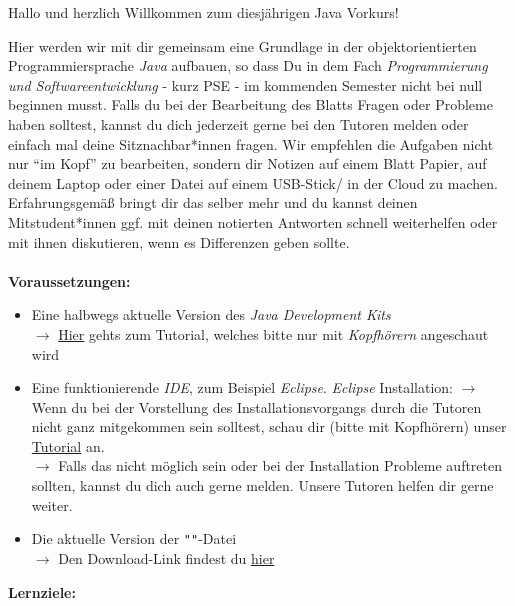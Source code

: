 
\begin{center}
	Hallo und herzlich Willkommen zum diesjährigen Java Vorkurs!\\
\end{center}
Hier werden wir mit dir gemeinsam eine Grundlage in der objektorientierten Programmiersprache \textit{Java} aufbauen, so dass Du in dem Fach \textit{Programmierung und Softwareentwicklung} - kurz PSE - im kommenden Semester nicht bei null beginnen musst.\newline
Falls du bei der Bearbeitung des Blatts Fragen oder Probleme haben solltest, kannst du dich jederzeit gerne bei den Tutoren melden oder einfach mal deine Sitznachbar*innen fragen.\newline
Wir empfehlen die Aufgaben nicht nur \enquote{im Kopf} zu bearbeiten, sondern dir Notizen auf einem Blatt Papier, auf deinem Laptop oder einer Datei auf einem USB-Stick/ in der Cloud zu machen. Erfahrungsgemäß bringt dir das selber mehr und du kannst deinen Mitstudent*innen ggf. mit deinen notierten Antworten schnell weiterhelfen oder mit ihnen diskutieren, wenn es Differenzen geben sollte.\\\\
\textbf{Voraussetzungen:}
\begin{itemize}
	\item Eine halbwegs aktuelle Version des \textit{Java Development Kits}\\
	$\rightarrow$ \href{\jdkTutorial}{Hier} gehts zum Tutorial, welches bitte nur mit \textit{Kopfhörern} angeschaut wird
	\item Eine funktionierende \textit{IDE}, zum Beispiel \textit{Eclipse}. \newline \textit{Eclipse} Installation: \newline
	$\rightarrow$ Wenn du bei der Vorstellung des Installationsvorgangs durch die Tutoren nicht ganz mitgekommen sein solltest, schau dir (bitte mit Kopfhörern) unser \href{\eclipseTutorial}{Tutorial} an.\\
	$\rightarrow$ Falls das nicht möglich sein oder bei der Installation Probleme auftreten sollten, kannst du dich auch gerne melden. Unsere Tutoren helfen dir gerne weiter.
	\item Die aktuelle Version der \texttt{"\jvkpackage"}-Datei\\
	$\rightarrow$ Den Download-Link findest du \href{\jvkpackageurl}{hier}
\end{itemize}
\textbf{Lernziele:}
